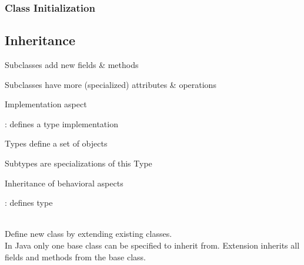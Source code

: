 \subsubsection{Class Initialization}
\begin{sectionbox}\nospacing
  
\end{sectionbox}
\subsection{Inheritance}
\begin{defnbox}\nospacing
  \begin{defn}\leavevmode
    \begin{itemizenosep}
        \item Subclasses add new fields \& methods
        \item Subclasses have more (specialized) attributes \& operations
        \item Implementation aspect
    \end{itemizenosep}
    : defines a type  implementation
  \end{defn}
\end{defnbox}
\begin{defnbox}\nospacing
  \begin{defn}\leavevmode
    \begin{itemizenosep}
        \item Types define a set of objects
        \item Subtypes are specializations of this Type
        \item Inheritance of behavioral aspects
    \end{itemizenosep}
    : defines type
  \end{defn}
\end{defnbox}
\begin{defnbox}\nospacing
  \begin{defn}\label{defn:extends}\leavevmode\\
    Define new class by extending existing classes.\\
    In Java only one base class can be specified to inherit from.
    Extension inherits all fields and methods from the base class.
  \end{defn}
\end{defnbox}

